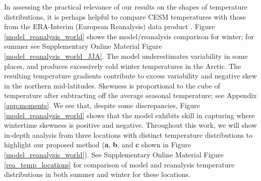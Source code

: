 \documentclass{ametsoc}
\begin{document}
{ In assessing the practical relevance of our results on the shapes of temperature distributions, it is perhaps helpful} to compare CESM temperatures with those from the ERA-Interim (European Reanalysis) data product \citep{dee2011era}. Figure \ref{model_reanalysis_world} shows the model/reanalysis comparison for winter; for summer see Supplementary Online Material Figure \ref{model_reanalysis_world_JJA}. The model underestimates variability in some places, and produces excessively cold winter temperatures in the Arctic. The resulting temperature gradients contribute to excess variability and negative skew in the northern mid-latitudes.
Skewness is proportional to the cube of temperature after subtracting off the average seasonal temperature; see Appendix \ref{app:moments}. 
{We see that, despite some discrepancies, Figure \ref{model_reanalysis_world} shows that the model exhibits skill in capturing where wintertime skewness is positive and negative.}
Throughout this work, we will show in-depth analysis from three locations with distinct temperature distributions to highlight our proposed method (\textbf{a}, \textbf{b}, and \textbf{c} shown in Figure \ref{model_reanalysis_world}). See Supplementary Online Material Figure \ref{rea_temp_locations} for comparison of model and reanalysis temperature distributions in both summer and winter for these locations. 
 
\end{document}
